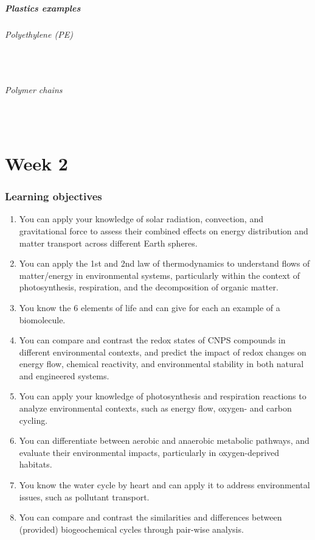 \documentclass{article}
\newcommand{\pph}[1]{\paragraph{#1}\phantom{}\\}
\begin{document}
\subsubsection{Plastics examples}

\pph{Polyethylene (PE)}
\begin{center}
\end{center}

\pph{Polymer chains}

\newpage
\part{Week 2}
\section{Learning objectives}
\begin{enumerate}
    \item You can apply your knowledge of solar radiation, convection, and gravitational force to assess their combined
    effects on energy distribution and matter transport across different Earth spheres.
    \item You can apply the 1st and 2nd law of thermodynamics to understand flows of matter/energy in environmental
    systems, particularly within the context of photosynthesis, respiration, and the decomposition of organic matter.
    \item You know the 6 elements of life and can give for each an example of a biomolecule.
    \item You can compare and contrast the redox states of CNPS compounds in different environmental contexts, and
    predict the impact of redox changes on energy flow, chemical reactivity, and environmental stability in both
    natural and engineered systems.
    \item You can apply your knowledge of photosynthesis and respiration reactions to analyze environmental contexts,
    such as energy flow, oxygen- and carbon cycling.
    \item You can differentiate between aerobic and anaerobic metabolic pathways, and evaluate their environmental
    impacts, particularly in oxygen-deprived habitats.
    \item You know the water cycle by heart and can apply it to address environmental issues, such as pollutant transport.
    \item You can compare and contrast the similarities and differences between (provided) biogeochemical cycles through
    pair-wise analysis.       
\end{enumerate}
\end{document}
